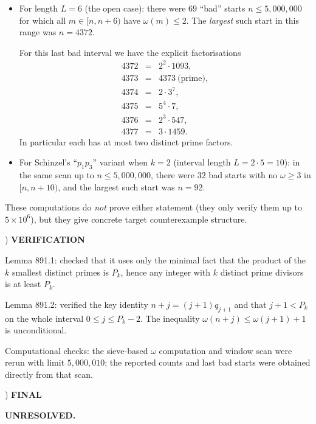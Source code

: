 \begin{itemize}
\item For length $L=6$ (the open case): there were $69$ ``bad'' starts $n\le 5{,}000{,}000$ for which all $m\in[n,n+6)$ have $\omega(m)\le 2$. The \emph{largest} such start in this range was $n=4372$.

For this last bad interval we have the explicit factorisations
\[
\begin{array}{rcl}
4372&=&2^2\cdot 1093,\\
4373&=&4373\ \text{(prime)},\\
4374&=&2\cdot 3^7,\\
4375&=&5^4\cdot 7,\\
4376&=&2^3\cdot 547,\\
4377&=&3\cdot 1459.
\end{array}
\]
In particular each has at most two distinct prime factors.

\item For Schinzel's ``$p_1p_3$'' variant when $k=2$ (interval length $L=2\cdot 5=10$): in the same scan up to $n\le 5{,}000{,}000$, there were $32$ bad starts with no $\omega\ge 3$ in $[n,n+10)$, and the largest such start was $n=92$.
\end{itemize}

\noindent These computations do \emph{not} prove either statement (they only verify them up to $5\times 10^6$), but they give concrete target counterexample structure.

) \textbf{VERIFICATION}

\noindent Lemma 891.1: checked that it uses only the minimal fact that the product of the $k$ smallest distinct primes is $P_k$, hence any integer with $k$ distinct prime divisors is at least $P_k$.

\noindent Lemma 891.2: verified the key identity $n+j = (j+1)q_{j+1}$ and that $j+1<P_k$ on the whole interval $0\le j\le P_k-2$. The inequality $\omega(n+j)\le \omega(j+1)+1$ is unconditional.

\noindent Computational checks: the sieve-based $\omega$ computation and window scan were rerun with limit $5{,}000{,}010$; the reported counts and last bad starts were obtained directly from that scan.

) \textbf{FINAL}

\noindent \textbf{UNRESOLVED.}

